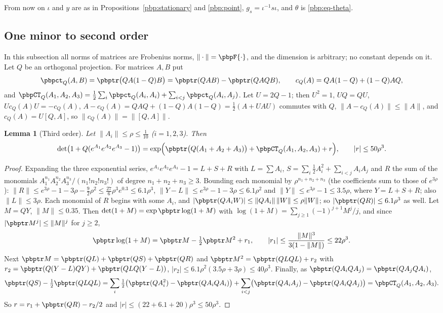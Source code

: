 \documentclass[10pt]{amsart}
\newtheorem{lemma}[theorem]{Lemma}
\theoremstyle{definition}
\theoremstyle{remark}
\begin{document}
From now on $\iota$ and $y$ are as in Propositions~\ref{pbp:stationary} and \ref{pbp:point}, $g_s=
\iota^{-1}s\iota$, and $\theta$ is \eqref{pbp:eq-theta}.

\subsection{One minor to second order}\label{pbp:ss-minor}

In this subsection all norms of matrices are Frobenius norms, $\|\cdot\|=\pbpF{\cdot}$, and the
dimension is arbitrary; no constant depends on it. Let $Q$ be an orthogonal projection. For matrices
$A,B$ put
\[
\pbpct_Q(A,B)=\pbptr\bigl(QA(1-Q)B\bigr)=\pbptr(QAB)-\pbptr(QAQB),\qquad c_Q(A)=QA(1-Q)+(1-Q)AQ,
\]
and $\pbpCT_Q(A_1,A_2,A_3)=\frac12\sum_i\pbpct_Q(A_i,A_i)+\sum_{i<j}\pbpct_Q(A_i,A_j)$. Let $U=2Q-1$;
then $U^2=1$, $UQ=QU$, $Uc_Q(A)U=-c_Q(A)$, $A-c_Q(A)=QAQ+(1-Q)A(1-Q)=\frac12(A+UAU)$ commutes
with $Q$, $\|A-c_Q(A)\|\le\|A\|$, and $c_Q(A)=U[Q,A]$, so $\|c_Q(A)\|=\|[Q,A]\|$.

\begin{lemma}[Third order]\label{pbp:third}
Let $\|A_i\|\le\rho\le\frac1{10}$ \textup($i=1,2,3$\textup). Then
\[
\det\bigl(1+Q(e^{A_1}e^{A_2}e^{A_3}-1)\bigr)=\exp\Bigl(\pbptr\bigl(Q(A_1+A_2+A_3)\bigr)+
\pbpCT_Q(A_1,A_2,A_3)+r\Bigr),\qquad|r|\le50\rho^3 .
\]
\end{lemma}
\begin{proof}
Expanding the three exponential series, $e^{A_1}e^{A_2}e^{A_3}-1=L+S+R$ with $L=\sum A_i$,
$S=\sum_i\frac12A_i^2+\sum_{i<j}A_iA_j$ and $R$ the sum of the monomials $A_1^{n_1}A_2^{n_2}A_3^{n_3}/
(n_1!n_2!n_3!)$ of degree $n_1+n_2+n_3\ge3$. Bounding each monomial by $\rho^{n_1+n_2+n_3}$ (the coefficients sum to those of
$e^{3\rho}$): $\|R\|\le e^{3\rho}-1-3\rho-\frac92\rho^2\le\frac{27}6\rho^3e^{0.3}\le6.1\rho^3$,
$\|Y-L\|\le e^{3\rho}-1-3\rho\le6.1\rho^2$ and $\|Y\|\le e^{3\rho}-1\le3.5\rho$, where $Y=L+S+R$; also
$\|L\|\le3\rho$. Each monomial of $R$ begins with some $A_i$, and $|\pbptr(QA_iW)|\le\|QA_i\|\,\|W\|\le
\rho\|W\|$; so $|\pbptr(QR)|\le6.1\rho^3$ as well. Let $M=QY$, $\|M\|\le0.35$. Then $\det(1+M)=
\exp\pbptr\log(1+M)$ with $\log(1+M)=\sum_{j\ge1}(-1)^{j+1}M^j/j$, and since $|\pbptr M^j|\le\|M\|^j$
for $j\ge2$,
\[
\pbptr\log(1+M)=\pbptr M-\tfrac12\pbptr M^2+r_1,\qquad|r_1|\le\frac{\|M\|^3}{3(1-\|M\|)}\le22\rho^3.
\]
Next $\pbptr M=\pbptr(QL)+\pbptr(QS)+\pbptr(QR)$ and $\pbptr M^2=\pbptr(QLQL)+r_2$ with $r_2=
\pbptr(Q(Y-L)QY)+\pbptr(QLQ(Y-L))$, $|r_2|\le6.1\rho^2(3.5\rho+3\rho)\le40\rho^3$. Finally, as
$\pbptr(QA_iQA_j)=\pbptr(QA_jQA_i)$,
\[
\pbptr(QS)-\tfrac12\pbptr(QLQL)=\sum_i\tfrac12\bigl(\pbptr(QA_i^2)-\pbptr(QA_iQA_i)\bigr)+\sum_{i<j}
\bigl(\pbptr(QA_iA_j)-\pbptr(QA_iQA_j)\bigr)=\pbpCT_Q(A_1,A_2,A_3).
\]
So $r=r_1+\pbptr(QR)-r_2/2$ and $|r|\le(22+6.1+20)\rho^3\le50\rho^3$.
\end{proof}
\end{document}
